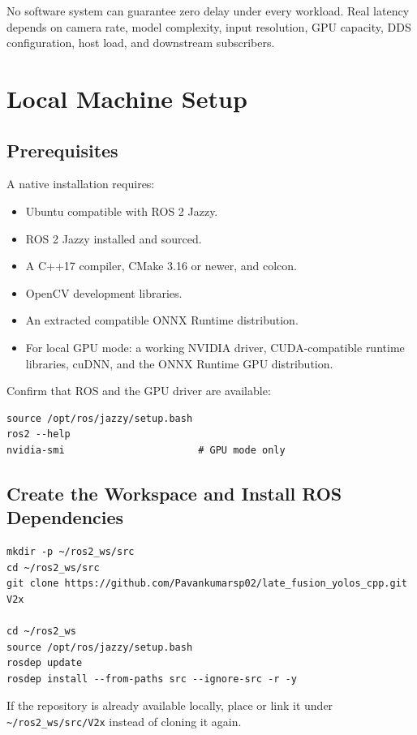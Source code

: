 \documentclass[11pt,a4paper]{article}
\begin{document}
No software system can guarantee zero delay under every workload. Real latency depends on camera rate, model complexity, input resolution, GPU capacity, DDS configuration, host load, and downstream subscribers.

\section{Local Machine Setup}

\subsection{Prerequisites}

A native installation requires:

\begin{itemize}
  \item Ubuntu compatible with ROS 2 Jazzy.
  \item ROS 2 Jazzy installed and sourced.
  \item A C++17 compiler, CMake 3.16 or newer, and colcon.
  \item OpenCV development libraries.
  \item An extracted compatible ONNX Runtime distribution.
  \item For local GPU mode: a working NVIDIA driver, CUDA-compatible runtime libraries, cuDNN, and the ONNX Runtime GPU distribution.
\end{itemize}

Confirm that ROS and the GPU driver are available:

\begin{lstlisting}
source /opt/ros/jazzy/setup.bash
ros2 --help
nvidia-smi                       # GPU mode only
\end{lstlisting}

\subsection{Create the Workspace and Install ROS Dependencies}

\begin{lstlisting}
mkdir -p ~/ros2_ws/src
cd ~/ros2_ws/src
git clone https://github.com/Pavankumarsp02/late_fusion_yolos_cpp.git V2x

cd ~/ros2_ws
source /opt/ros/jazzy/setup.bash
rosdep update
rosdep install --from-paths src --ignore-src -r -y
\end{lstlisting}

If the repository is already available locally, place or link it under \texttt{\textasciitilde/ros2\_ws/src/V2x} instead of cloning it again.
\end{document}
